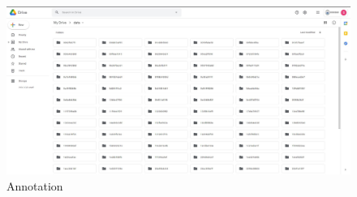 \documentclass[conference]{IEEEtran}
\begin{document}
\begin{figure}[h!]
\centering
\includegraphics[scale=.16]{validation.JPG}
\caption{Annotation}
\label{fig:annotation}
\end{figure}

\vspace*{.5cm}
\end{document}
